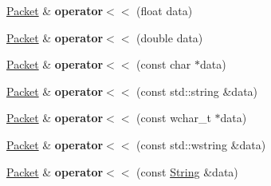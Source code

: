 \begin{DoxyCompactItemize}
\item 
\hypertarget{classsf_1_1Packet_a76d31c4f864253a7e9b53701b4660fe5}{\hyperlink{classsf_1_1Packet}{Packet} \& {\bfseries operator$<$$<$} (float data)}\label{classsf_1_1Packet_a76d31c4f864253a7e9b53701b4660fe5}

\item 
\hypertarget{classsf_1_1Packet_a3b3077720a486b569ac8e7dec638a3f0}{\hyperlink{classsf_1_1Packet}{Packet} \& {\bfseries operator$<$$<$} (double data)}\label{classsf_1_1Packet_a3b3077720a486b569ac8e7dec638a3f0}

\item 
\hypertarget{classsf_1_1Packet_a67c9985f7b3d6e90886e56e309280a9d}{\hyperlink{classsf_1_1Packet}{Packet} \& {\bfseries operator$<$$<$} (const char $\ast$data)}\label{classsf_1_1Packet_a67c9985f7b3d6e90886e56e309280a9d}

\item 
\hypertarget{classsf_1_1Packet_a59a21671caaa69da5d47c54b50e1eb54}{\hyperlink{classsf_1_1Packet}{Packet} \& {\bfseries operator$<$$<$} (const std\-::string \&data)}\label{classsf_1_1Packet_a59a21671caaa69da5d47c54b50e1eb54}

\item 
\hypertarget{classsf_1_1Packet_a6f7c6a9ce795fac342ea937896d98016}{\hyperlink{classsf_1_1Packet}{Packet} \& {\bfseries operator$<$$<$} (const wchar\-\_\-t $\ast$data)}\label{classsf_1_1Packet_a6f7c6a9ce795fac342ea937896d98016}

\item 
\hypertarget{classsf_1_1Packet_a9f3401d038470f629d0c2c6be928a14b}{\hyperlink{classsf_1_1Packet}{Packet} \& {\bfseries operator$<$$<$} (const std\-::wstring \&data)}\label{classsf_1_1Packet_a9f3401d038470f629d0c2c6be928a14b}

\item 
\hypertarget{classsf_1_1Packet_abc17272df082a36b202e10045bd9e220}{\hyperlink{classsf_1_1Packet}{Packet} \& {\bfseries operator$<$$<$} (const \hyperlink{classsf_1_1String}{String} \&data)}\label{classsf_1_1Packet_abc17272df082a36b202e10045bd9e220}

\end{DoxyCompactItemize}
